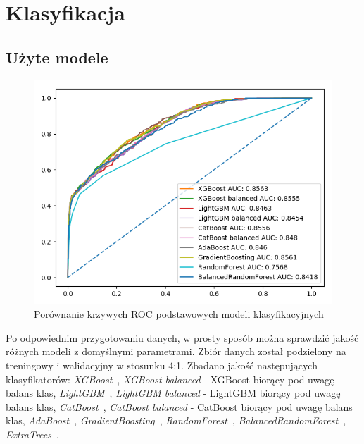 \documentclass[a4paper,12pt]{article}
\begin{document}
    \section{Klasyfikacja}

    \subsection{Użyte modele}

    \begin{figure}
        \centering
        \includegraphics[width=\linewidth]{../images/roc-comparison.png}
        \caption{Porównanie krzywych ROC podstawowych modeli klasyfikacyjnych}
        \label{fig:roc-comparison}
    \end{figure}

    Po odpowiednim przygotowaniu danych, w prosty sposób można sprawdzić jakość różnych modeli z domyślnymi parametrami.
    Zbiór danych został podzielony na treningowy i walidacyjny w stosunku 4:1.
    Zbadano jakość następujących klasyfikatorów: \textit{XGBoost}~\cite{xgboost}, \textit{XGBoost balanced} - XGBoost biorący pod uwagę balans klas, \textit{LightGBM}~\cite{lightgbm}, \textit{LightGBM balanced} - LightGBM biorący pod uwagę balans klas, \textit{CatBoost}~\cite{catboost}, \textit{CatBoost balanced} - CatBoost biorący pod uwagę balans klas, \textit{AdaBoost}~\cite{adaboost}, \textit{GradientBoosting}~\cite{gradient-boosting}, \textit{RandomForest}~\cite{random-forest}, \textit{BalancedRandomForest}~\cite{balanced-random-forest}, \textit{ExtraTrees}~\cite{extra-trees}.
\end{document}
